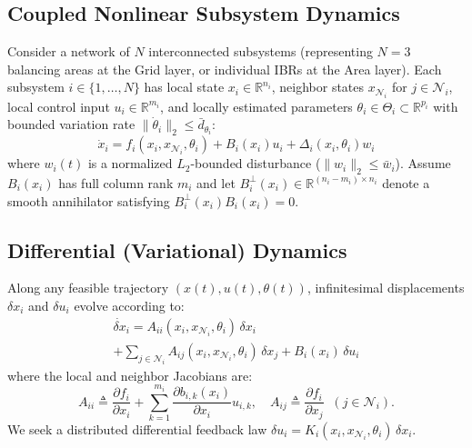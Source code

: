 \documentclass[journal]{IEEEtran}
\begin{document}
\subsection{Coupled Nonlinear Subsystem Dynamics}
Consider a network of $N$ interconnected subsystems (representing $N=3$ balancing areas at the Grid layer, or individual IBRs at the Area layer). Each subsystem $i \in \{1, \dots, N\}$ has local state $x_i \in \mathbb{R}^{n_i}$, neighbor states $x_{\mathcal{N}_i}$ for $j \in \mathcal{N}_i$, local control input $u_i \in \mathbb{R}^{m_i}$, and locally estimated parameters $\theta_i \in \Theta_i \subset \mathbb{R}^{p_i}$ with bounded variation rate $\|\dot{\theta}_i\|_2 \le \bar{d}_{\theta_i}$:
\begin{equation}
\dot{x}_i = f_i(x_i, x_{\mathcal{N}_i}, \theta_i) + B_i(x_i) u_i + \Delta_i(x_i, \theta_i) w_i
\end{equation}
where $w_i(t)$ is a normalized $L_2$-bounded disturbance ($\|w_i\|_2 \le \bar{w}_i$). Assume $B_i(x_i)$ has full column rank $m_i$ and let $B_i^\perp(x_i) \in \mathbb{R}^{(n_i - m_i) \times n_i}$ denote a smooth annihilator satisfying $B_i^\perp(x_i) B_i(x_i) = 0$.

\subsection{Differential (Variational) Dynamics}
Along any feasible trajectory $(x(t), u(t), \theta(t))$, infinitesimal displacements $\delta x_i$ and $\delta u_i$ evolve according to:
\begin{multline}
\dot{\delta x}_i = A_{ii}(x_i, x_{\mathcal{N}_i}, \theta_i)\,\delta x_i \\
+ \sum_{j \in \mathcal{N}_i} A_{ij}(x_i, x_{\mathcal{N}_i}, \theta_i)\,\delta x_j + B_i(x_i)\,\delta u_i
\end{multline}
where the local and neighbor Jacobians are:
\begin{equation}
A_{ii} \triangleq \frac{\partial f_i}{\partial x_i} + \sum_{k=1}^{m_i} \frac{\partial b_{i,k}(x_i)}{\partial x_i} u_{i,k}, \quad
A_{ij} \triangleq \frac{\partial f_i}{\partial x_j} \;\; (j \in \mathcal{N}_i).
\end{equation}
We seek a distributed differential feedback law $\delta u_i = K_i(x_i, x_{\mathcal{N}_i}, \theta_i)\,\delta x_i$.
\end{document}
